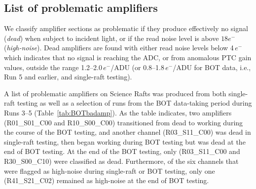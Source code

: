 \clearpage
\subsection{List of problematic amplifiers}\label{deadamplifiers}

We classify amplifier sections as problematic if they produce effectively no signal ({\it dead}) when subject to incident light, or if the read noise level is above $18e^{-}$ ({\it high-noise}).  Dead amplifiers are found with either read noise levels below 4\,$e^{-}$ which indicates that no signal is reaching the ADC, or from anomalous PTC gain values, outside the range 1.2--2.0\,$e^{-}$/ADU (or 0.8--1.8\,$e^{-}$/ADU for BOT data, i.e., Run 5 and earlier, and single-raft testing).

A list of problematic amplifiers on Science Rafts was produced from both single-raft testing as well as a selection of runs from the BOT data-taking period during Runs 3--5 (Table~\ref{tab:BOTbadamp}). As the table indicates, two amplifiers (R01\_S01\_C00 and R10\_S00\_C00) transitioned from dead to working during the course of the BOT testing, and another channel (R03\_S11\_C00) was dead in single-raft testing, then began working during BOT testing but was dead at the end of BOT testing. At the end of the BOT testing, only (R03\_S11\_C00 and R30\_S00\_C10) were classified as dead. Furthermore, of the six channels that were flagged as high-noise during single-raft or BOT testing, only one (R41\_S21\_C02) remained as high-noise at the end of BOT testing.

